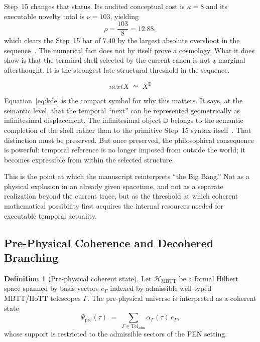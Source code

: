 \documentclass[11pt,a4paper]{article}
\def\bigcirc{next}%
\theoremstyle{plain}
\theoremstyle{definition}
\newtheorem{definition}[theorem]{Definition}
\theoremstyle{remark}
\newcommand{\D}{\mathbb{D}}
\newcommand{\nextmod}{\bigcirc}
\newcommand{\HMBTT}{\mathcal{H}_{\mathrm{MBTT}}}
\begin{document}
Step~15 changes that status.
Its audited conceptual cost is $\kappa = 8$ and its executable novelty total is $\nu = 103$, yielding
\[
    \rho = \frac{103}{8} = 12.88,
\]
which clears the Step~15 bar of $7.40$ by the largest absolute overshoot in the sequence~\cite{pen}.
The numerical fact does not by itself prove a cosmology.
What it does show is that the terminal shell selected by the current canon is not a marginal afterthought.
It is the strongest late structural threshold in the sequence.

\begin{equation}
\label{eq:kde}
    \nextmod X \;\simeq\; X^{\D}
\end{equation}

Equation~\eqref{eq:kde} is the compact symbol for why this matters.
It says, at the semantic level, that the temporal ``next'' can be represented geometrically as infinitesimal displacement.
The infinitesimal object $\D$ belongs to the semantic completion of the shell rather than to the primitive Step~15 syntax itself~\cite{pen}.
That distinction must be preserved.
But once preserved, the philosophical consequence is powerful: temporal reference is no longer imposed from outside the world; it becomes expressible from within the selected structure.

This is the point at which the manuscript reinterprets ``the Big Bang.''
Not as a physical explosion in an already given spacetime, and not as a separate realization beyond the current trace, but as the threshold at which coherent mathematical possibility first acquires the internal resources needed for executable temporal actuality.

\subsection{Pre-Physical Coherence and Decohered Branching}
\label{subsec:qmonad}

\begin{definition}[Pre-physical coherent state]
\label{def:qmonad}
Let $\HMBTT$ be a formal Hilbert space spanned by basis vectors $e_{\Gamma}$ indexed by admissible well-typed MBTT/HoTT telescopes $\Gamma$.
The pre-physical universe is interpreted as a coherent state
\[
    \Psi_{\mathrm{pre}}(\tau)
    \;=\;
    \sum_{\Gamma \in \mathrm{Tel}_{\mathrm{adm}}}
    \alpha_{\Gamma}(\tau)\, e_{\Gamma},
\]
whose support is restricted to the admissible sectors of the PEN setting.
\end{definition}
\end{document}
